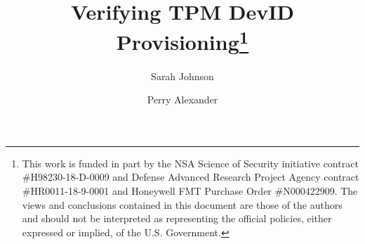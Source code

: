 \documentclass[runningheads]{llncs}
\begin{document}
%
\title{Verifying TPM DevID Provisioning\thanks{This work is funded in part
    by the NSA Science of Security initiative contract
    \#H98230-18-D-0009 and Defense Advanced Research Project Agency
    contract \#HR0011-18-9-0001 and Honeywell FMT Purchase Order
    \#N000422909. The views and conclusions contained in this document
    are those of the authors and should not be interpreted as
    representing the official policies, either expressed or implied,
    of the U.S. Government.}}
%
%
\author{Sarah Johnson \and
Perry Alexander}
%
%
%
\maketitle              %
%
\end{document}
